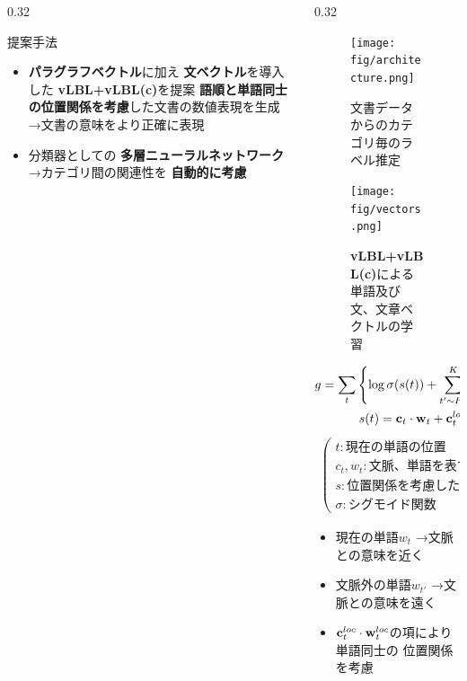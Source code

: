 \documentclass[8pt,unicode]{beamer}
\newcommand{\columnscale}{0.32}
\newcommand{\arrow}{{\color{ttiblue} →}\hspace{1ex}}
\newcommand{\good}[1]{\textbf{\color{orange} #1}}
\newcommand{\keyword}[1]{\textbf{\color{red} #1}}
\begin{document}
\begin{frame}{}
\begin{columns}[t]
\begin{column}{\columnscale\textwidth}
  \begin{block}{提案手法}
    \begin{itemize}
      \item \keyword{パラグラフベクトル}に加え\keyword{文ベクトル}を導入した
        \keyword{vLBL+vLBL(c)}を提案
        \good{語順と単語同士の位置関係を考慮}した文書の数値表現を生成 \\
        \arrow 文書の意味をより正確に表現
      \item 分類器としての\keyword{多層ニューラルネットワーク} \\
        \arrow カテゴリ間の関連性を\good{自動的に考慮}
    \end{itemize}
  \end{block}
\end{column} %

\begin{column}{\columnscale\textwidth} %
    \begin{figure}
      \texttt{[image: fig/architecture.png]}
      \caption{文書データからのカテゴリ毎のラベル推定}
      \texttt{[image: fig/vectors.png]}
      \caption{\keyword{vLBL+vLBL(c)}による単語及び文、文章ベクトルの学習}
    \end{figure}

    {\Large
    \begin{gather*}
      g = \sum_t \left\{ \log\sigma(s(t))
          + \sum^K_{t' \sim P_n} \log(1 - \sigma(s(t'))) \right\} \\
      s(t) = {\bf c}_t \cdot {\bf w}_t
             + {\bf c}^{loc}_t \cdot {\bf w}^{loc}_t + b_t \\
    \end{gather*}
    }
    \begin{gather*}
      \left(
      \begin{matrix}
        t : 現在の単語の位置 \\
        c_t, w_t : 文脈、単語を表すベクトル \\
        s : 位置関係を考慮した単語と文脈の類似度 \\
        σ : シグモイド関数
      \end{matrix}
      \right)
    \end{gather*}

    \begin{itemize}
      \item 現在の単語\(w_t\) \arrow 文脈との意味を近く
      \item 文脈外の単語\(w_{t'}\) \arrow 文脈との意味を遠く
      \item \({\bf c}^{loc}_t \cdot {\bf w}^{loc}_t\)の項により単語同士の
        位置関係を考慮
    \end{itemize}
\end{column} %


\end{columns}
\end{frame}
\end{document}
